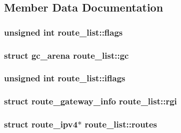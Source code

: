 \subsection{Member Data Documentation}
\hypertarget{structroute__list_ac0e940e04d4b5156590f41552d9bcef9}{}
\subsubsection[{flags}]{\setlength{\rightskip}{0pt plus 5cm}unsigned int route\+\_\+list\+::flags}\label{structroute__list_ac0e940e04d4b5156590f41552d9bcef9}
\hypertarget{structroute__list_ad209cc7d8c318bf74a05b6d7472941f4}{}
\subsubsection[{gc}]{\setlength{\rightskip}{0pt plus 5cm}struct {\bf gc\+\_\+arena} route\+\_\+list\+::gc}\label{structroute__list_ad209cc7d8c318bf74a05b6d7472941f4}
\hypertarget{structroute__list_afd4d48cc38b5ebeb7f64a133c7decdff}{}
\subsubsection[{iflags}]{\setlength{\rightskip}{0pt plus 5cm}unsigned int route\+\_\+list\+::iflags}\label{structroute__list_afd4d48cc38b5ebeb7f64a133c7decdff}
\hypertarget{structroute__list_a366bf50ec63559c4577cd28670cef3f8}{}
\subsubsection[{rgi}]{\setlength{\rightskip}{0pt plus 5cm}struct {\bf route\+\_\+gateway\+\_\+info} route\+\_\+list\+::rgi}\label{structroute__list_a366bf50ec63559c4577cd28670cef3f8}
\hypertarget{structroute__list_a87e014a2d9333f896c538c82abc9e263}{}
\subsubsection[{routes}]{\setlength{\rightskip}{0pt plus 5cm}struct {\bf route\+\_\+ipv4}$\ast$ route\+\_\+list\+::routes}\label{structroute__list_a87e014a2d9333f896c538c82abc9e263}
\hypertarget{structroute__list_a8b0265a1e6b98143c03ff728b232a454}{}
